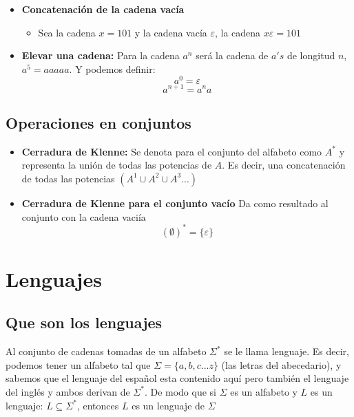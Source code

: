 \documentclass[letterpaper,12pt]{article}
\begin{document}
{\begin{itemize}
    \item \textbf{Concatenación de la cadena vacía}
    \begin{itemize}
        \item Sea la cadena $x = 101$ y la cadena vacía $\varepsilon$, la cadena $x\varepsilon = 101$
    \end{itemize}
    
    
    \item\textbf{Elevar una cadena:}  Para la cadena $a^{n}$ será la cadena de $a's$ de longitud $n$, $a^{5} = aaaaa $. Y podemos definir:
    \begin{equation*}
        a^{0} =  \varepsilon
    \end{equation*}
    \begin{equation*}
        a^{n+1} = a^{n}a
    \end{equation*}
    
\end{itemize}

    
\subsection*{Operaciones en conjuntos}        
\begin{itemize}
    \item \textbf{Cerradura de Klenne:}  Se denota para el conjunto del alfabeto como $A^{*}$ y representa la unión de todas las potencias de $A$. Es decir, una concatenación de todas las potencias $(A^{1} \cup A^{2} \cup A^{3}...)$
    
    \item \textbf{Cerradura de Klenne para el conjunto vacío}
    Da como resultado al conjunto con la cadena vaciía 
    \begin{equation*}
        (\emptyset)^{*}  = \{ \varepsilon \}
    \end{equation*}
    
\end{itemize}

\section*{Lenguajes}
\subsection*{Que son los lenguajes}

Al conjunto de cadenas tomadas de un alfabeto $\Sigma^{*}$ se le llama lenguaje. Es decir, podemos tener un alfabeto tal que $\Sigma = \{ a, b, c ...z \}$ (las letras del abecedario), y sabemos que el lenguaje del español esta contenido aquí pero también el lenguaje del inglés y ambos derivan de $\Sigma^{*}$. De modo que si $\Sigma$ es un alfabeto y $L$ es un lenguaje: $L \subseteq \Sigma^{*}$, entonces $L$ es un lenguaje de $\Sigma$

}
\end{document}
